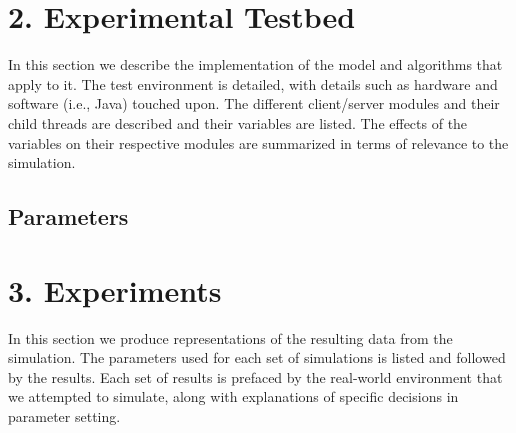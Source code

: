 \documentclass[11pt]{article}
\begin{document}
\section{2. Experimental Testbed}
In this section we describe the implementation of the model and algorithms that apply to it. The test environment is detailed, with details such as hardware and software (i.e., Java) touched upon. The different client/server modules and their child threads are described and their variables are listed. The effects of the variables on their respective modules are summarized in terms of relevance to the simulation.
\subsection{Parameters}
\section{3. Experiments}
In this section we produce representations of the resulting data from the simulation. The parameters used for each set of simulations is listed and followed by the results. Each set of results is prefaced by the real-world environment that we attempted to simulate, along with explanations of specific decisions in parameter setting.
\end{document}
